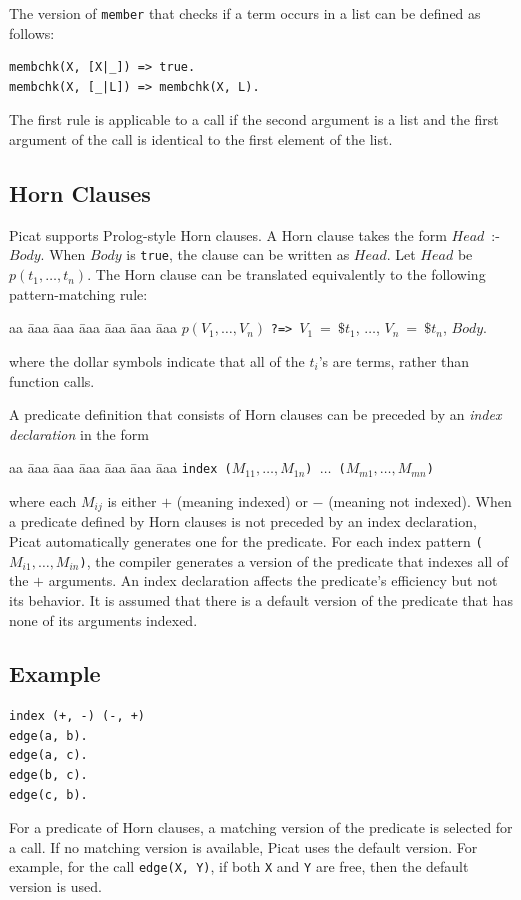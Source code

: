 The version of \texttt{member} that checks if a term occurs in a list can be defined as follows:
\begin{verbatim}
membchk(X, [X|_]) => true.
membchk(X, [_|L]) => membchk(X, L).
\end{verbatim}
The first rule is applicable to a call if the second argument is a list and the first argument of the call is identical to the first element of the list.

\subsection*{\label{section:horn}Horn Clauses}
Picat supports Prolog-style Horn clauses. A Horn clause takes the form $Head$\ :-\ $Body$. When $Body$ is \texttt{true}, the clause can be written as $Head$. Let $Head$ be $p(t_1, \ldots, t_n)$. The Horn clause can be translated equivalently to the following pattern-matching rule:
\begin{tabbing}
aa \= aaa \= aaa \= aaa \= aaa \= aaa \= aaa \kill
\> $p(V_1, \ldots, V_n)$ \verb+?=>+\ $V_1\ =\ \$t_1$, $\ldots$, $V_n\ =\ \$t_n$, $Body$.
\end{tabbing}
where the dollar symbols indicate that all of the $t_i$'s are terms, rather than function calls.

A predicate definition that consists of Horn clauses can be preceded by an \emph{index declaration} in the form
\begin{tabbing}
aa \= aaa \= aaa \= aaa \= aaa \= aaa \= aaa \kill
\> \texttt{index ($M_{11}, \ldots, M_{1n}$) $\ldots$ ($M_{m1}, \ldots, M_{mn}$)}
\end{tabbing}
where each $M_{ij}$ is either $+$ (meaning indexed) or $-$ (meaning not indexed). When a predicate defined by Horn clauses is not preceded by an index declaration, Picat automatically generates one for the predicate. For each index pattern \texttt{($M_{i1}, \ldots, M_{in}$)}, the compiler generates a version of the predicate that indexes all of the $+$ arguments. An index declaration affects the predicate's efficiency but not its behavior. It is assumed that there is a default version of the predicate that has none of its arguments indexed.


\subsection*{Example}
\begin{verbatim}
index (+, -) (-, +)
edge(a, b).
edge(a, c).
edge(b, c).
edge(c, b).
\end{verbatim}
For a predicate of Horn clauses, a matching version of the predicate is selected for a call. If no matching version is available, Picat uses the default version. For example, for the call \texttt{edge(X, Y)}, if both \texttt{X} and \texttt{Y} are free, then the default version is used.

